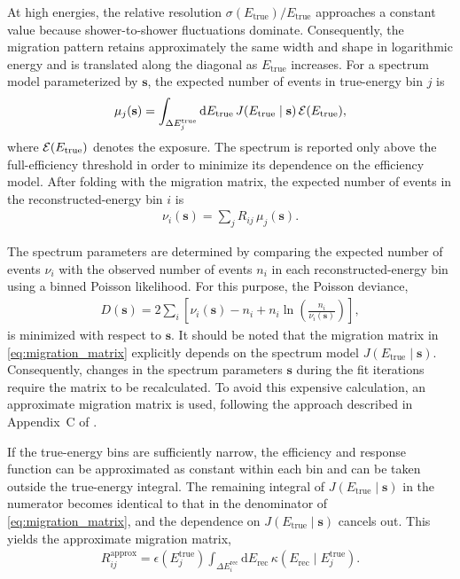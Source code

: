 \documentclass[main.tex]{subfiles}
\begin{document}
At high energies, the relative resolution $\sigma(E_{\mathrm{true}})/E_{\mathrm{true}}$ approaches a constant value because shower-to-shower fluctuations dominate.
Consequently, the migration pattern retains approximately the same width and shape in logarithmic energy and is translated along the diagonal as $E_{\mathrm{true}}$ increases.
For a spectrum model parameterized by $\mathbf{s}$, the expected number of events in true-energy bin $j$ is
\begin{align}
    \mu_j(\mathbf{s})
    =
    \int_{\Delta E_j^{\mathrm{true}}}
    \mathrm{d}E_{\mathrm{true}}\,
    J(E_{\mathrm{true}}\mid\mathbf{s})
    \,\mathcal{E}(E_{\mathrm{true}}),
    \label{eq:expected_true_counts}
\end{align}
where $\mathcal{E}(E_{\mathrm{true}})$ denotes the exposure.
The spectrum is reported only above the full-efficiency threshold in order to minimize its dependence on the efficiency model.
After folding with the migration matrix, the expected number of events in the reconstructed-energy bin $i$ is
\begin{align}
    \nu_i(\mathbf{s})
    =
    \sum_j R_{ij}\,\mu_j(\mathbf{s}).
    \label{eq:expected_reconstructed_counts}
\end{align}

The spectrum parameters are determined by comparing the expected number of events $\nu_i$ with the observed number of events $n_i$ in each reconstructed-energy bin using a binned Poisson likelihood.
For this purpose, the Poisson deviance,
\begin{align}
    D(\mathbf{s})
    =
    2\sum_i
    \left[
        \nu_i(\mathbf{s})-n_i
        +
        n_i\ln\left(
            \frac{n_i}{\nu_i(\mathbf{s})}
        \right)
    \right],
    \label{eq:poisson_deviance2}
\end{align}
is minimized with respect to $\mathbf{s}$.
It should be noted that the migration matrix in \cref{eq:migration_matrix} explicitly depends on the spectrum model $J(E_{\mathrm{true}}\mid\mathbf{s})$.
Consequently, changes in the spectrum parameters $\mathbf{s}$ during the fit iterations require the matrix to be recalculated.
To avoid this expensive calculation, an approximate migration matrix is used, following the approach described in Appendix~C of \cite{PierreAuger:2020:Spectrum}.

If the true-energy bins are sufficiently narrow, the efficiency and response function can be approximated as constant within each bin and can be taken outside the true-energy integral.
The remaining integral of $J(E_{\mathrm{true}}\mid\mathbf{s})$ in the numerator becomes identical to that in the denominator of \cref{eq:migration_matrix}, and the dependence on $J(E_{\mathrm{true}}\mid\mathbf{s})$ cancels out.
This yields the approximate migration matrix,
\begin{align}
    R_{ij}^{\mathrm{approx}}
    =
    \epsilon(E_j^{\mathrm{true}})
    \int_{\Delta E_i^{\mathrm{rec}}}
    \mathrm{d}E_{\mathrm{rec}}\,
    \kappa(E_{\mathrm{rec}}\mid E_j^{\mathrm{true}}).
    \label{eq:matrix_approx}
\end{align}
\end{document}
